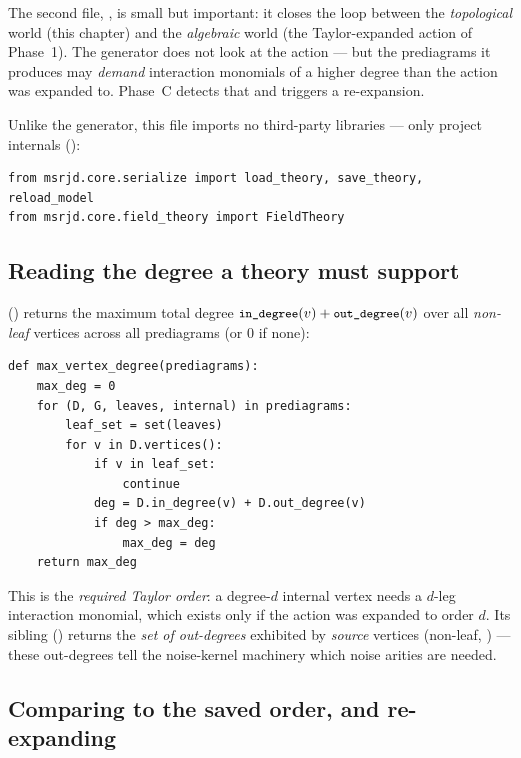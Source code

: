 The second file, , is small but
important: it closes the loop between the \emph{topological} world (this chapter)
and the \emph{algebraic} world (the Taylor-expanded action of Phase~1). The
generator does not look at the action --- but the prediagrams it produces may
\emph{demand} interaction monomials of a higher degree than the action was
expanded to. Phase~C detects that and triggers a re-expansion.

Unlike the generator, this file imports no third-party libraries --- only project
internals ():

\begin{lstlisting}
from msrjd.core.serialize import load_theory, save_theory, reload_model
from msrjd.core.field_theory import FieldTheory
\end{lstlisting}

\subsection{Reading the degree a theory must support}

 () returns the
maximum total degree $\texttt{\small in\_degree}(v)+\texttt{\small out\_degree}(v)$ over all
\emph{non-leaf} vertices across all prediagrams (or $0$ if none):

\begin{lstlisting}
def max_vertex_degree(prediagrams):
    max_deg = 0
    for (D, G, leaves, internal) in prediagrams:
        leaf_set = set(leaves)
        for v in D.vertices():
            if v in leaf_set:
                continue
            deg = D.in_degree(v) + D.out_degree(v)
            if deg > max_deg:
                max_deg = deg
    return max_deg
\end{lstlisting}

This is the \emph{required Taylor order}: a degree-$d$ internal vertex needs a
$d$-leg interaction monomial, which exists only if the action was expanded to
order $d$. Its sibling 
() returns the \emph{set of out-degrees} exhibited by
\emph{source} vertices (non-leaf, ) --- these out-degrees
tell the noise-kernel machinery which noise arities are needed.

\subsection{Comparing to the saved order, and re-expanding}

